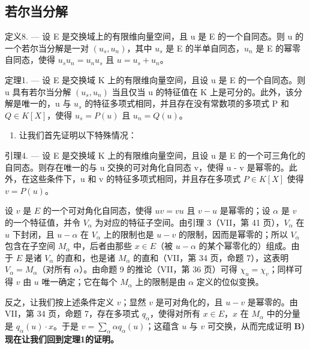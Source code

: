 \subsection{若尔当分解}

定义8. --- 设 E 是交换域上的有限维向量空间，且 u 是 E 的一个自同态。则 u 的一个若尔当分解是一对 \((u_{s}, u_{n})\)，其中 \(u_{s}\) 是 E 的半单自同态，\(u_{n}\) 是 E 的幂零自同态，使得 \(u_{s}u_{n} = u_{n}u_{s}\) 且 \(u = u_{s} + u_{n}\)。

定理1. --- 设 E 是交换域 K 上的有限维向量空间，且设 u 是 E 的一个自同态。则 u 具有若尔当分解 \((u_{s}, u_{n})\) 当且仅当 u 的特征值在 K 上是可分的。此外，该分解是唯一的，u 与 \(u_{s}\) 的特征多项式相同，并且存在没有常数项的多项式 P 和 \(Q \in K[X]\)，使得 \(u_{s} = P(u)\) 且 \(u_{n} = Q(u)\)。

\begin{enumerate}
\def\labelenumi{\Alph{enumi})}
\tightlist
\item
  让我们首先证明以下特殊情况：
\end{enumerate}

引理4. --- 设 E 是交换域 K 上的有限维向量空间，且设 u 是 E 的一个可三角化的自同态。则存在唯一的与 u 交换的可对角化自同态 v，使得 u - v 是幂零的。此外，在这些条件下，u 和 v 的特征多项式相同，并且存在多项式 \(P \in K[X]\) 使得 \(v = P(u)\)。

设 \(v\) 是 \(E\) 的一个可对角化自同态，使得 \(uv = vu\) 且 \(v - u\) 是幂零的；设 \(\alpha\) 是 \(v\) 的一个特征值，并令 \(V_{\alpha}\) 为对应的特征子空间。由引理 3（VII，第 41 页），\(V_{\alpha}\) 在 \(u\) 下封闭，且 \(u - \alpha\) 在 \(V_{\alpha}\) 上的限制也是 \(u - v\) 的限制，因而是幂零的；所以 \(V_{\alpha}\) 包含在子空间 \(M_{\alpha}\) 中，后者由那些 \(x \in E\)（被 \(u - \alpha\) 的某个幂零化的）组成。由于 \(E\) 是诸 \(V_{\alpha}\) 的直和，也是诸 \(M_{\alpha}\) 的直和（VII，第 34 页，命题 7），这表明 \(V_{\alpha} = M_{\alpha}\)（对所有 \(\alpha\)）。由命题 9 的推论（VII，第 36 页）可得 \(\chi_u = \chi_v\)；同样可得 \(v\) 由 \(u\) 唯一确定；它在每个 \(M_{\alpha}\) 上的限制是由 \(\alpha\) 定义的位似变换。

反之，让我们按上述条件定义 \(v\)；显然 \(v\) 是可对角化的，且 \(u - v\) 是幂零的。由 VII，第 34 页，命题 7，存在多项式 \(q_{\alpha}\)，使得对所有 \(x \in E\)，\(x\) 在 \(M_{\alpha}\) 中的分量是 \(q_{\alpha}(u) \cdot x\)。于是 \(v = \sum_{\alpha} \alpha q_{\alpha}(u)\)；这蕴含 \(u\) 与 \(v\) 可交换，从而完成证明
\relax{}
\textbf{B) 现在让我们回到定理1的证明。}\par

